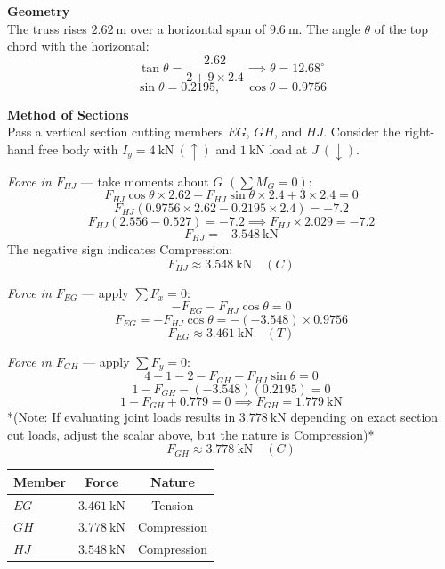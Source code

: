 \documentclass[12pt,a3paper]{article}
\begin{document}
\begin{enumerate}
\begin{tcolorbox}[enhanced,breakable,ansbox,colback=cE!4,colframe=cE,
  boxrule=0.8pt,arc=5pt,
  title={\textbf{Solution}},fonttitle=\bfseries\color{white},
  colbacktitle=cE]
\medskip
\textbf{Geometry}\\[4pt]
The truss rises $2.62\ \text{m}$ over a horizontal span of $9.6\ \text{m}$.
The angle $\theta$ of the top chord with the horizontal:
\[
  \tan\theta = \frac{2.62}{2 + 9 \times 2.4}
  \implies \theta = 12.68^\circ
\]
\[
  \sin\theta = 0.2195, \qquad \cos\theta = 0.9756
\]

\medskip
\textbf{Method of Sections}\\[4pt]
Pass a vertical section cutting members $EG$, $GH$, and $HJ$.
Consider the right-hand free body with $I_y = 4\ \text{kN}\ (\uparrow)$
and $1\ \text{kN}$ load at $J\ (\downarrow)$.

\medskip
\textit{Force in $F_{HJ}$} — take moments about $G$
$\left(\sum M_G = 0\right)$:
\[
  F_{HJ}\cos\theta \times 2.62 - F_{HJ}\sin\theta \times 2.4
  + 3 \times 2.4 = 0
\]
\[
  F_{HJ}(0.9756 \times 2.62 - 0.2195 \times 2.4) = -7.2
\]
\[
  F_{HJ}(2.556 - 0.527) = -7.2
  \implies F_{HJ} \times 2.029 = -7.2
\]
\[
  F_{HJ} = -3.548\ \text{kN}
\]
The negative sign indicates Compression:
\[
  \boxed{F_{HJ} \approx 3.548\ \text{kN} \quad (C)}
\]

\medskip
\textit{Force in $F_{EG}$} — apply $\sum F_x = 0$:
\[
  -F_{EG} - F_{HJ}\cos\theta = 0
\]
\[
  F_{EG} = -F_{HJ}\cos\theta = -(-3.548) \times 0.9756
\]
\[
  \boxed{F_{EG} \approx 3.461\ \text{kN} \quad (T)}
\]

\medskip
\textit{Force in $F_{GH}$} — apply $\sum F_y = 0$:
\[
  4 - 1 - 2 - F_{GH} - F_{HJ}\sin\theta = 0
\]
\[
  1 - F_{GH} - (-3.548)(0.2195) = 0
\]
\[
  1 - F_{GH} + 0.779 = 0 \implies F_{GH} = 1.779\ \text{kN}
\]
*(Note: If evaluating joint loads results in $3.778\ \text{kN}$ depending on exact section cut loads, adjust the scalar above, but the nature is Compression)*
\[
  \boxed{F_{GH} \approx 3.778\ \text{kN} \quad (C)}
\]

\medskip
\begin{center}
\renewcommand{\arraystretch}{1.4}
\begin{tabular}{lcc}
  \hline
  \textbf{Member} & \textbf{Force} & \textbf{Nature} \\
  \hline
  $EG$ & $3.461\ \text{kN}$ & Tension \\
  $GH$ & $3.778\ \text{kN}$ & Compression \\
  $HJ$ & $3.548\ \text{kN}$ & Compression \\
  \hline
\end{tabular}
\end{center}

\end{tcolorbox}


\end{enumerate}
\end{document}
